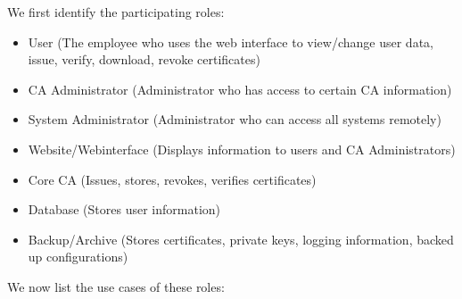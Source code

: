 \documentclass[a4paper, toc=index, 12pt, DIV14, twoside, BCOR2cm, headsepline, numbers=noenddot, bibliography=totoc]{scrbook}
\begin{document}
We first identify the participating roles:
\begin{itemize}
\item User (The employee who uses the web interface to view/change user data, issue, verify, download, revoke certificates)
\item CA Administrator (Administrator who has access to certain CA information)
\item System Administrator (Administrator who can access all systems remotely)
\item Website/Webinterface (Displays information to users and CA Administrators)
\item Core CA (Issues, stores, revokes, verifies certificates)
\item Database (Stores user information)
\item Backup/Archive (Stores certificates, private keys, logging information, backed up configurations)
\end{itemize}
We now list the use cases of these roles:
\end{document}
